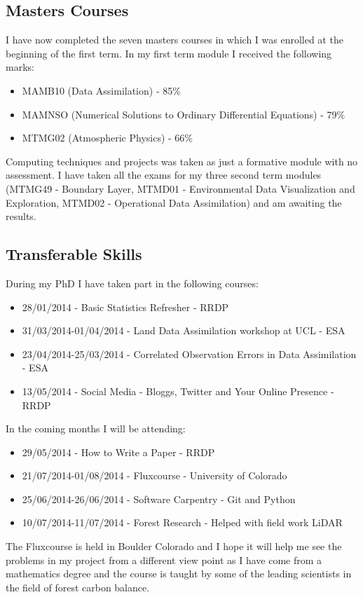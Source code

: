 \documentclass[11pt]{article}
\begin{document}
\subsection*{Masters Courses}
I have now completed the seven masters courses in which I was enrolled at the beginning of the first term. In my first term module I received the following marks:
\begin{itemize}
\item MAMB10 (Data Assimilation) - 85\%
\item MAMNSO (Numerical Solutions to Ordinary Differential Equations) - 79\%
\item MTMG02 (Atmospheric Physics) - 66\%
\end{itemize}
Computing techniques and projects was taken as just a formative module with no assessment. I have taken all the exams for my three second term modules (MTMG49 - Boundary Layer, MTMD01 - Environmental Data Visualization and Exploration, MTMD02 - Operational Data Assimilation) and am awaiting the results. 

\subsection*{Transferable Skills}

During my PhD I have taken part in the following courses:
\begin{itemize}
\item 28/01/2014 - Basic Statistics Refresher - RRDP

\item 31/03/2014-01/04/2014 - Land Data Assimilation workshop at UCL - ESA

\item 23/04/2014-25/03/2014 - Correlated Observation Errors in Data Assimilation - ESA

\item 13/05/2014 - Social Media - Bloggs, Twitter and Your Online Presence - RRDP
\end{itemize}
In the coming months I will be attending:
\begin{itemize}
\item 29/05/2014 - How to Write a Paper - RRDP
\item 21/07/2014-01/08/2014 - Fluxcourse - University of Colorado
\item 25/06/2014-26/06/2014 - Software Carpentry - Git and Python
\item 10/07/2014-11/07/2014 - Forest Research - Helped with field work LiDAR 
\end{itemize}
The Fluxcourse is held in Boulder Colorado and I hope it will help me see the problems in my project from a different view point as I have come from a mathematics degree and the course is taught by some of the leading scientists in the field of forest carbon balance.  


{}

\end{document}
